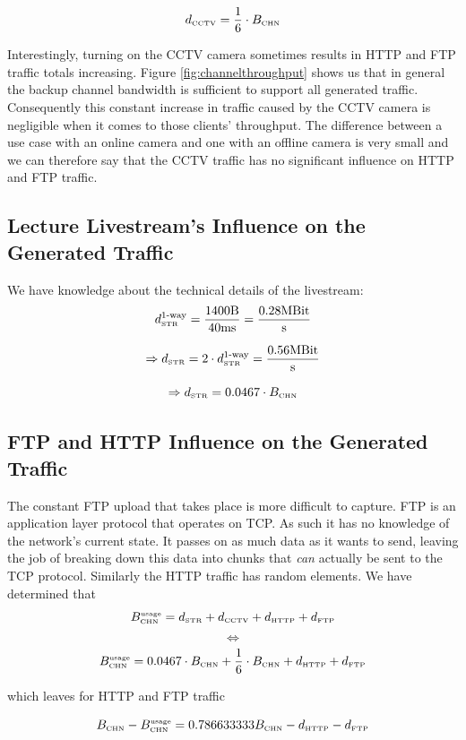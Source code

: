 \documentclass[a4paper]{scrreprt}
\begin{document}
			\[d_\text{\tiny CCTV}=\frac{1}{6}\cdot B_\text{\tiny CHN}\]
			
			Interestingly, turning on the CCTV camera sometimes results in HTTP and FTP traffic totals increasing. Figure \ref{fig:channelthroughput} shows us that in general the backup channel bandwidth is sufficient to support all generated traffic. Consequently this constant increase in traffic caused by the CCTV camera is negligible when it comes to those clients' throughput. The difference between a use case with an online camera and one with an offline camera is very small and we can therefore say that the CCTV traffic has no significant influence on HTTP and FTP traffic.
		
			\subsection{Lecture Livestream's Influence on the Generated Traffic}
			We have knowledge about the technical details of the livestream: 
		\[d_\text{\tiny STR}^\text{1-way}=\frac{1400\text{B}}{40\text{ms}}=\frac{0.28\text{MBit}}{\text{s}}\]
		
			\[\Rightarrow d_\text{\tiny STR}=2\cdot d_\text{\tiny STR}^\text{1-way}=\frac{0.56\text{MBit}}{\text{s}}\]
			
			\[\Rightarrow d_\text{\tiny STR}=0.0467\cdot B_\text{\tiny CHN}\]
			
			\subsection{FTP and HTTP Influence on the Generated Traffic}\label{sec:ftpinfluence}
			The constant FTP upload that takes place is more difficult to capture. FTP is an application layer protocol that operates on TCP. As such it has no knowledge of the network's current state. It passes on as much data as it wants to send, leaving the job of breaking down this data into chunks that \emph{can} actually be sent to the TCP protocol. 										
			Similarly the HTTP traffic has random elements. We have determined that
			\[B_\text{\tiny CHN}^\text{\tiny usage} = d_\text{\tiny STR}+d_\text{\tiny CCTV}+d_\text{\tiny HTTP}+d_\text{\tiny FTP}\]
			\[\Leftrightarrow\]
			\[B_\text{\tiny CHN}^\text{\tiny usage} = 0.0467\cdot B_\text{\tiny CHN} + \frac{1}{6}\cdot B_\text{\tiny CHN} + d_\text{\tiny HTTP} + d_\text{\tiny FTP}\]
			
			which leaves for HTTP and FTP traffic
			
			\[B_\text{\tiny CHN}-B_\text{\tiny CHN}^\text{\tiny usage}=0.786633333B_\text{\tiny CHN} - d_\text{\tiny HTTP} - d_\text{\tiny FTP}\]
			
\end{document}
